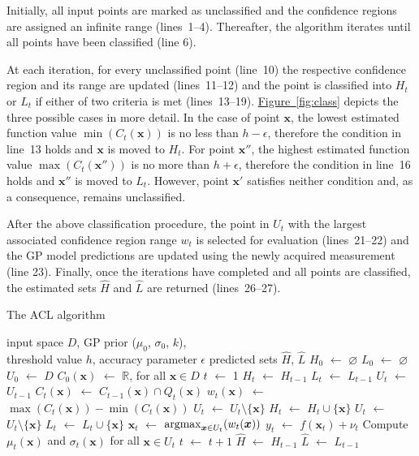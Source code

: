 \documentclass{article}
\def\*#1{\bm{#1}}
\newcommand*\LET[2]{\STATE #1 $\gets$ #2}
\newcommand{\figref}[1]{\hyperref[#1]{\mbox{Figure~\ref*{#1}}}}
\newcommand{\argmax}{\operatornamewithlimits{argmax}}
\newcommand{\acl}{\textsf{ACL}\xspace}
\begin{document}
Initially, all input points are marked as unclassified and the
confidence regions are assigned an infinite range (lines~1--4). Thereafter,
the algorithm iterates until all points have been classified (line 6).

At each iteration, for every unclassified point
(line~10) the respective confidence region and its range are updated
(lines~11--12) and the point is classified into $H_t$ or $L_t$ if either
of two criteria is met (lines~13--19). \figref{fig:class} depicts the
three possible cases in more detail. In the case of point $\*x$,
the lowest estimated function value $\min(C_t(\*x))$ is no less
than $h-\epsilon$, therefore the condition in line~13 holds and $\*x$
is moved to $H_t$. For point $\*x''$, the highest estimated
function value $\max(C_t(\*x''))$ is no more than $h+\epsilon$,
therefore the condition in line~16 holds and $\*x''$ is moved to $L_t$.
However, point $\*x'$ satisfies neither condition and, as a consequence,
remains unclassified.

After the above classification procedure, the point in $U_t$
with the largest associated confidence region range $w_t$ is selected for
evaluation (lines~21--22) and the GP model predictions are updated using the
newly acquired measurement (line 23). Finally, once the iterations have
completed and all points are classified, the estimated sets $\hat{H}$ and
$\hat{L}$ are returned  (lines~26--27).

\begin{algorithm}[tb]
  \caption{The \acl algorithm}
  \label{alg:acl}
\begin{algorithmic}[1]
  \REQUIRE input space $D$, GP prior ($\mu_0$, $\sigma_0$, $k$),\\
           \hspace{1.9em}threshold value $h$, accuracy parameter $\epsilon$
  \ENSURE predicted sets $\hat{H}$, $\hat{L}$
  \LET{$H_0$}{$\varnothing$}
  \LET{$L_0$}{$\varnothing$}
  \LET{$U_0$}{$D$}
  \LET{$C_0(\*x)$}{$\mathbb{R}$, for all $\*x \in D$}
  \LET{$t$}{1}
    \LET{$H_t$}{$H_{t-1}$}
    \LET{$L_t$}{$L_{t-1}$}
    \LET{$U_t$}{$U_{t-1}$}
    \FORALL{$\*x \in U_{t-1}$}
      \LET{$C_{t}(\*x)$}{$C_{t-1}(\*x) \cap Q_t(\*x)$}
      \LET{$w_{t}(\*x)$}{$\max(C_{t}(\*x)) - \min(C_{t}(\*x))$}
      \IF{$\min(C_t(\*x)) + \epsilon \geq h$}
        \LET{$U_t$}{$U_t \setminus \{\*x\}$}
        \LET{$H_t$}{$H_t \cup \{\*x\}$}
      \ELSIF{$\max(C_t(\*x)) - \epsilon \leq h$}
        \LET{$U_t$}{$U_t \setminus \{\*x\}$}
        \LET{$L_t$}{$L_t \cup \{\*x\}$}
      \ENDIF
    \ENDFOR
    \LET{$\*x_t$}{$\argmax_{\*x \in U_t}(w_t(\*x))$}
    \LET{$y_t$}{$f(\*x_t) + \nu_t$}
    \STATE Compute $\mu_t(\*x)$ and $\sigma_t(\*x)$ for all $\*x \in U_t$
    \LET{$t$}{$t + 1$}
  \ENDWHILE
  \LET{$\hat{H}$}{$H_{t-1}$}
  \LET{$\hat{L}$}{$L_{t-1}$}
\end{algorithmic}
\end{algorithm}
\end{document}
